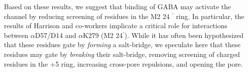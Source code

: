 \documentclass[12pt,onecolumn]{biophys}
\begin{document}
Based on these results, we suggest that binding of GABA may activate the channel by reducing screening of residues in the M2 24 $^{\prime}$ ring. In particular, the results of Harrison and co-workers \cite{Kash2003} implicate a critical role for interactions between $\alpha$D57/D14 and $\alpha$K279 (M2 24$^{\prime}$). While it has often been hypothesized that these residues gate by {\it forming} a salt-bridge, we speculate here that these residues may gate by {\it breaking} their salt-bridge, removing screening of charged residues in the +5 ring, increasing cross-pore repulsions, and opening the pore. 

\end{document}
